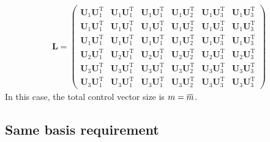 \documentclass[12pt]{scrartcl}
\newcommand{\overbar}[1]{\mkern 1.5mu\overline{\mkern-1.5mu#1\mkern-1.5mu}\mkern 1.5mu}
\begin{document}
\begin{align}
\mathbf{L} = \left( \begin{array}{ccc|c|cc}
\mathbf{U}_1 \mathbf{U}_1^\mathrm{T} & \mathbf{U}_1 \mathbf{U}_1^\mathrm{T} & \mathbf{U}_1 \mathbf{U}_1^\mathrm{T} & \mathbf{U}_1 \mathbf{U}_2^\mathrm{T} & \mathbf{U}_1 \mathbf{U}_3^\mathrm{T} & \mathbf{U}_1 \mathbf{U}_3^\mathrm{T} \\
\mathbf{U}_1 \mathbf{U}_1^\mathrm{T} & \mathbf{U}_1 \mathbf{U}_1^\mathrm{T} & \mathbf{U}_1 \mathbf{U}_1^\mathrm{T} & \mathbf{U}_1 \mathbf{U}_2^\mathrm{T} & \mathbf{U}_1 \mathbf{U}_3^\mathrm{T} & \mathbf{U}_1 \mathbf{U}_3^\mathrm{T} \\
\mathbf{U}_1 \mathbf{U}_1^\mathrm{T} & \mathbf{U}_1 \mathbf{U}_1^\mathrm{T} & \mathbf{U}_1 \mathbf{U}_1^\mathrm{T} & \mathbf{U}_1 \mathbf{U}_2^\mathrm{T} & \mathbf{U}_1 \mathbf{U}_3^\mathrm{T} & \mathbf{U}_1 \mathbf{U}_3^\mathrm{T} \\[0.3ex]
\hline
\mathbf{U}_2 \mathbf{U}_1^\mathrm{T} & \mathbf{U}_2 \mathbf{U}_1^\mathrm{T} & \mathbf{U}_2 \mathbf{U}_1^\mathrm{T} & \mathbf{U}_2 \mathbf{U}_2^\mathrm{T} & \mathbf{U}_2 \mathbf{U}_3^\mathrm{T} & \mathbf{U}_2 \mathbf{U}_3^\mathrm{T} \\[0.3ex]
\hline
\mathbf{U}_3 \mathbf{U}_1^\mathrm{T} & \mathbf{U}_3 \mathbf{U}_1^\mathrm{T} & \mathbf{U}_3 \mathbf{U}_1^\mathrm{T} & \mathbf{U}_3 \mathbf{U}_2^\mathrm{T} & \mathbf{U}_3 \mathbf{U}_3^\mathrm{T} & \mathbf{U}_3 \mathbf{U}_3^\mathrm{T} \\
\mathbf{U}_3 \mathbf{U}_1^\mathrm{T} & \mathbf{U}_3 \mathbf{U}_1^\mathrm{T} & \mathbf{U}_3 \mathbf{U}_1^\mathrm{T} & \mathbf{U}_3 \mathbf{U}_2^\mathrm{T} & \mathbf{U}_3 \mathbf{U}_3^\mathrm{T} & \mathbf{U}_3 \mathbf{U}_3^\mathrm{T}
\end{array} \right)
\end{align}
In this case, the total control vector size is $\displaystyle m = \overbar{m}$.\\

\subsection{Same basis requirement}
\end{document}
